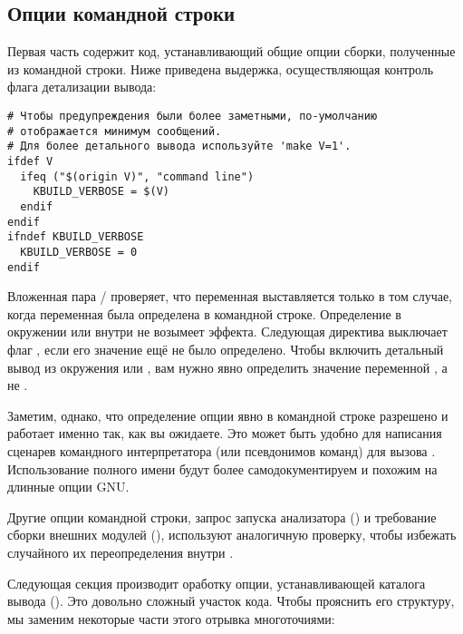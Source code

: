 \subsection{Опции командной строки}
Первая часть  содержит код, устанавливающий общие опции
сборки, полученные из командной строки. Ниже приведена выдержка,
осуществляющая контроль флага детализации вывода:

\begin{verbatim}
# Чтобы предупреждения были более заметными, по-умолчанию
# отображается минимум сообщений.
# Для более детального вывода используйте 'make V=1'.
ifdef V
  ifeq ("$(origin V)", "command line")
    KBUILD_VERBOSE = $(V)
  endif
endif
ifndef KBUILD_VERBOSE
  KBUILD_VERBOSE = 0
endif
\end{verbatim}

Вложенная пара / проверяет, что
переменная  выставляется только в том
случае, когда переменная  была определена в командной
строке. Определение  в окружении или внутри 
не возымеет эффекта. Следующая директива  выключает
флаг , если его значение ещё не было
определено. Чтобы включить детальный вывод из окружения или
, вам нужно явно определить значение переменной
, а не .

Заметим, однако, что определение опции  явно
в командной строке разрешено и работает именно так, как вы
ожидаете. Это может быть удобно для написания сценарев командного
интерпретатора (или псевдонимов команд) для вызова
. Использование полного имени будут более
самодокументируем и похожим на длинные опции GNU.

Другие опции командной строки, запрос запуска анализатора
 () и требование сборки внешних модулей
(), используют аналогичную проверку, чтобы избежать
случайного их переопределения внутри .

Следующая секция  производит оработку опции,
устанавливающей каталога вывода (). Это довольно сложный
участок кода. Чтобы прояснить его структуру, мы заменим некоторые
части этого отрывка многоточиями:

